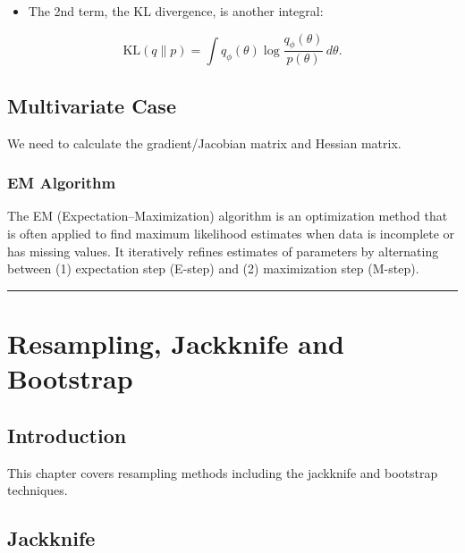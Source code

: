 \documentclass[
  letterpaper,
  DIV=11,
  numbers=noendperiod]{scrreprt}
\providecommand{\tightlist}{%
  \setlength{\itemsep}{0pt}\setlength{\parskip}{0pt}}
\begin{document}
\begin{itemize}
\tightlist
\item
  The 2nd term, the KL divergence, is another integral:
\end{itemize}

\[\text{KL}(q \| p) = \int q_\phi(\theta) \log \frac{q_\phi(\theta)}{p(\theta)} \, d\theta.\]

\section{}\label{section}

\section{Multivariate Case}\label{multivariate-case}

We need to calculate the gradient/Jacobian matrix and Hessian matrix.

\subsection{EM Algorithm}\label{em-algorithm}

The EM (Expectation--Maximization) algorithm is an optimization method
that is often applied to find maximum likelihood estimates when data is
incomplete or has missing values. It iteratively refines estimates of
parameters by alternating between (1) expectation step (E-step) and (2)
maximization step (M-step).

\begin{center}\rule{0.5\linewidth}{0.5pt}\end{center}


\chapter{Resampling, Jackknife and
Bootstrap}\label{resampling-jackknife-and-bootstrap}

\section{Introduction}\label{introduction}

This chapter covers resampling methods including the jackknife and
bootstrap techniques.

\section{Jackknife}\label{jackknife}
\end{document}
